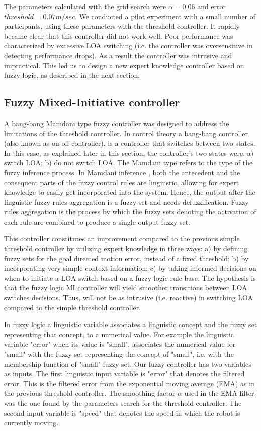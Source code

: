 \documentclass[a4paper,12pt,oneside,openright]{bhamthesis}
\begin{document}
The parameters calculated with the grid search were $\alpha = 0.06$ and error $threshold = 0.07 m/sec$. We conducted a pilot experiment with a small number of participants, using these parameters with the threshold controller. It rapidly became clear that this controller did not work well. Poor performance was characterized by excessive LOA switching (i.e. the controller was oversensitive in detecting performance drops). As a result the controller was intrusive and impractical. This led us to design a new expert knowledge controller based on fuzzy logic, as described in the next section.

\subsection{Fuzzy Mixed-Initiative controller}
\label{chapter5:fuzzy_controller}
A bang-bang Mamdani type fuzzy controller \cite{Mamdani1975,Nagi2009} was designed to address the limitations of the threshold controller. In control theory a bang-bang controller (also known as on-off controller), is a controller that switches between two states. In this case, as explained later in this section, the controller's two states were: a) switch LOA; b) do not switch LOA. The Mamdani type refers to the type of the fuzzy inference process. In Mamdani inference \cite{Mamdani1975}, both the antecedent and the consequent parts of the fuzzy control rules are linguistic, allowing for expert knowledge to easily get incorporated into the system. Hence, the output after the linguistic fuzzy rules aggregation is a fuzzy set and needs defuzzification. Fuzzy rules aggregation is the process by which the fuzzy sets denoting the activation of each rule are combined to produce a single output fuzzy set. 

This controller constitutes an improvement compared to the previous simple threshold controller by utilizing expert knowledge in three ways: a) by defining fuzzy sets for the goal directed motion error, instead of a fixed threshold; b) by incorporating very simple context information; c) by taking informed decisions on when to initiate a LOA switch based on a fuzzy logic rule base. The hypothesis is that the fuzzy logic MI controller will yield smoother transitions between LOA switches decisions. Thus, will not be as intrusive (i.e. reactive) in switching LOA compared to the simple threshold controller.

In fuzzy logic a linguistic variable associates a linguistic concept and the fuzzy set representing that concept, to a numerical value. For example the linguistic variable "error" when its value is "small", associates the numerical value for "small" with the fuzzy set representing the concept of "small", i.e. with the membership function of "small" fuzzy set. Our fuzzy controller has two variables as inputs. The first linguistic input variable is "error" that denotes the filtered error. This is the filtered error from the exponential moving average (EMA) as in the previous threshold controller. The smoothing factor $\alpha$ used in the EMA filter, was the one found by the parameters search for the threshold controller. The second input variable is "speed" that denotes the speed in which the robot is currently moving. 
\end{document}
